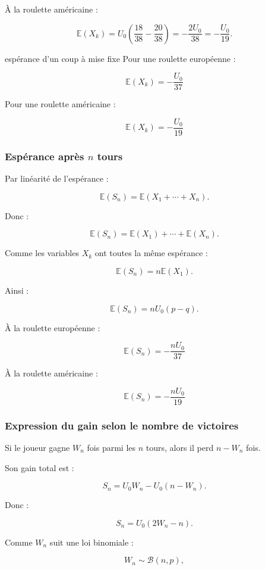 \documentclass[11pt,a4paper]{article}
\begin{document}
À la roulette américaine :

\[
\mathbb{E}(X_k)
=
U_0\left(\frac{18}{38}-\frac{20}{38}\right)
=
-\frac{2U_0}{38}
=
-\frac{U_0}{19}.
\]

\begin{equationbox}{espérance d'un coup à mise fixe}
Pour une roulette européenne :

\[
\boxed{\mathbb{E}(X_k)=-\frac{U_0}{37}}
\]

Pour une roulette américaine :

\[
\boxed{\mathbb{E}(X_k)=-\frac{U_0}{19}}
\]
\end{equationbox}

\subsubsection*{Espérance après \(n\) tours}

Par linéarité de l'espérance :

\[
\mathbb{E}(S_n)
=
\mathbb{E}(X_1+\cdots+X_n).
\]

Donc :

\[
\mathbb{E}(S_n)
=
\mathbb{E}(X_1)+\cdots+\mathbb{E}(X_n).
\]

Comme les variables \(X_k\) ont toutes la même espérance :

\[
\mathbb{E}(S_n)=n\mathbb{E}(X_1).
\]

Ainsi :

\[
\mathbb{E}(S_n)=nU_0(p-q).
\]

À la roulette européenne :

\[
\boxed{\mathbb{E}(S_n)=-\frac{nU_0}{37}}
\]

À la roulette américaine :

\[
\boxed{\mathbb{E}(S_n)=-\frac{nU_0}{19}}
\]

\subsubsection*{Expression du gain selon le nombre de victoires}

Si le joueur gagne \(W_n\) fois parmi les \(n\) tours, alors il perd \(n-W_n\) fois.

Son gain total est :

\[
S_n=U_0W_n-U_0(n-W_n).
\]

Donc :

\[
S_n=U_0(2W_n-n).
\]

Comme \(W_n\) suit une loi binomiale :

\[
W_n\sim \mathcal{B}(n,p),
\]
\end{document}
